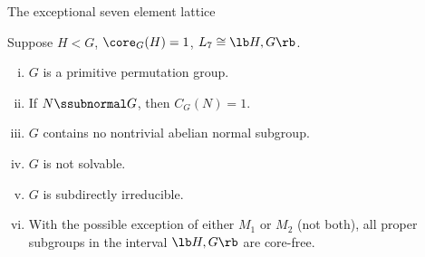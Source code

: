 \begin{frame}[fragile,label=NewConclusion,shrink=5]{The exceptional seven element lattice}
      \begin{center}
      \end{center}
    \begin{theorem}
      \label{thm:except-seven-elem}
      Suppose $H<G$, \hskip2mm $\core_G(H) = 1$, \hskip2mm $L_7 \cong \lb H,G \rb$.
      \begin{enumerate}[(i)]
      \item<1-> $G$ is a primitive permutation group.
      \item<1-> If $N\ssubnormal G$, then $C_G(N) = 1$.
      \item<1-> $G$ contains no nontrivial abelian normal subgroup.
      \item<1-> $G$ is not solvable.
      \item<1-> $G$ is subdirectly irreducible.
      \item<1-> With the possible exception of either $M_1$ or $M_2$ (not both),
        all proper subgroups in the interval $\lb H,G \rb$ are core-free. 
      \end{enumerate}
    \end{theorem}

\end{frame}







